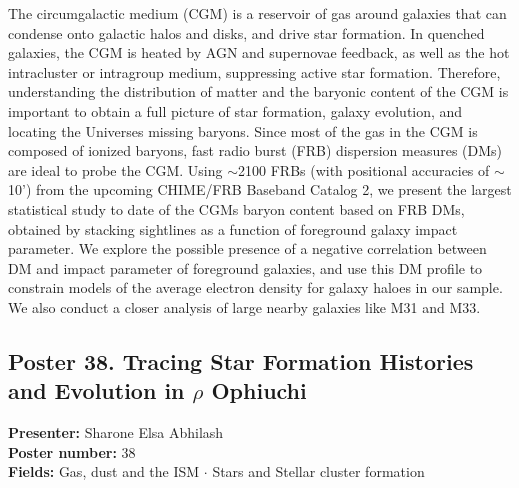 The circumgalactic medium (CGM) is a reservoir of gas around galaxies that can condense onto galactic halos and disks, and drive star formation. In quenched galaxies, the CGM is heated by AGN and supernovae feedback, as well as the hot intracluster or intragroup medium, suppressing active star formation. Therefore, understanding the distribution of matter and the baryonic content of the CGM is important to obtain a full picture of star formation, galaxy evolution, and locating the Universes missing baryons. Since most of the gas in the CGM is composed of ionized baryons, fast radio burst (FRB) dispersion measures (DMs) are ideal to probe the CGM. Using $\sim$2100 FRBs (with positional accuracies of $\sim$10') from the upcoming CHIME/FRB Baseband Catalog 2, we present the largest statistical study to date of the CGMs baryon content based on FRB DMs, obtained by stacking sightlines as a function of foreground galaxy impact parameter. We explore the possible presence of a negative correlation between DM and impact parameter of foreground galaxies, and use this DM profile to constrain models of the average electron density for galaxy haloes in our sample. We also conduct a closer analysis of large nearby galaxies like M31 and M33.

\hypertarget{poster-abstract-talk-159}{}\label{poster-abstract-page-talk-159}
\subsection*{Poster 38. Tracing Star Formation Histories and Evolution in $\rho$ Ophiuchi}
\textbf{Presenter:} Sharone Elsa Abhilash\\
\textbf{Poster number:} 38\\
\textbf{Fields:} Gas, dust and the ISM $\cdot$ Stars and Stellar cluster formation

